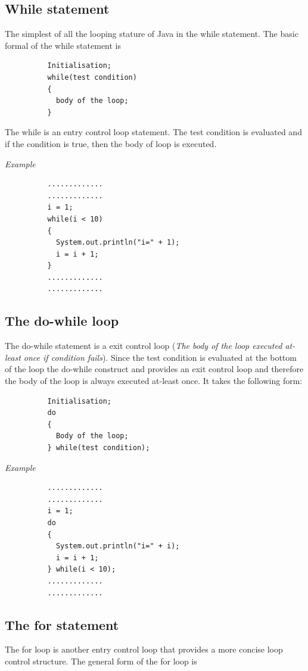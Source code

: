 \documentclass[11pt, a4paper]{book}
\begin{document}
      \subsection{While statement}
        The simplest of all the looping stature of Java in the while statement. The basic formal of the while statement is 
        \begin{lstlisting}
          Initialisation;
          while(test condition)
          {
            body of the loop;
          }
        \end{lstlisting}
        The while is an entry control loop statement. The test condition is evaluated and if the condition is true, then the body of loop is executed.
        
        \textit{Example}
        \begin{lstlisting}
          .............
          .............
          i = 1;
          while(i < 10)
          {
            System.out.println("i=" + 1);
            i = i + 1;
          }
          .............
          .............
        \end{lstlisting}
      
      
      \subsection{The do-while loop}
        The do-while statement is a exit control loop (\textit{The body of the loop executed at-least once if condition fails}). Since the test condition is evaluated at the bottom of the loop the do-while construct and provides an exit control loop and therefore the body of the loop is always executed at-least once. It takes the following form:
  
        \begin{lstlisting}
          Initialisation;
          do 
          {
            Body of the loop;
          } while(test condition);
        \end{lstlisting}
        
        \textit{Example}
        \begin{lstlisting}
          .............
          .............
          i = 1;
          do 
          {
            System.out.println("i=" + i);
            i = i + 1;
          } while(i < 10);
          .............
          .............
        \end{lstlisting}
      
      \subsection{The for statement}
        The for loop is another entry control loop that provides a more concise loop control structure. The general form of the for loop is
        
\end{document}
